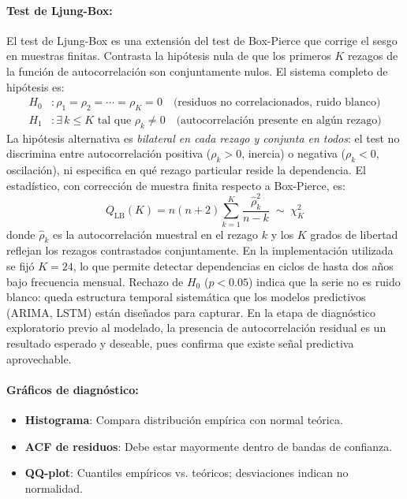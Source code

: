 \paragraph{Test de Ljung-Box:}
El test de Ljung-Box \parencite{LjungBox1978} es una extensión del test de Box-Pierce
que corrige el sesgo en muestras finitas. Contrasta la hipótesis
nula de que los primeros $K$ rezagos de la función de autocorrelación son conjuntamente nulos.
El sistema completo de hipótesis es:
\begin{align}
H_0 &: \rho_1 = \rho_2 = \cdots = \rho_K = 0
      \quad \text{(residuos no correlacionados, ruido blanco)}\\
H_1 &: \exists\, k \leq K \text{ tal que } \rho_k \neq 0
      \quad \text{(autocorrelación presente en algún rezago)}
\end{align}
La hipótesis alternativa es \textit{bilateral en cada rezago y conjunta en todos}:
el test no discrimina entre autocorrelación positiva ($\rho_k > 0$, inercia) o negativa
($\rho_k < 0$, oscilación), ni especifica en qué rezago particular reside la dependencia.
El estadístico, con corrección de muestra finita respecto a Box-Pierce, es:
\begin{equation}
Q_{\text{LB}}(K) = n(n+2) \sum_{k=1}^{K} \frac{\hat{\rho}_k^2}{n-k} \;\sim\; \chi^2_K
\label{eq:ljung_box}
\end{equation}
donde $\hat{\rho}_k$ es la autocorrelación muestral en el rezago $k$ y los $K$ grados de
libertad reflejan los rezagos contrastados conjuntamente. En la implementación utilizada se
fijó $K = 24$, lo que permite detectar dependencias en ciclos de hasta dos años bajo
frecuencia mensual. Rechazo de $H_0$ ($p < 0.05$) indica que la serie no es ruido blanco:
queda estructura temporal sistemática que los modelos predictivos (ARIMA, LSTM) están
diseñados para capturar. En la etapa de diagnóstico exploratorio previo al modelado, la
presencia de autocorrelación residual es un resultado esperado y deseable, pues confirma
que existe señal predictiva aprovechable.

\paragraph{Gráficos de diagnóstico:}
\begin{itemize}
\item \textbf{Histograma}: Compara distribución empírica con normal teórica.
\item \textbf{ACF de residuos}: Debe estar mayormente dentro de bandas de confianza.
\item \textbf{QQ-plot}: Cuantiles empíricos vs. teóricos; desviaciones indican no normalidad.
\end{itemize}


